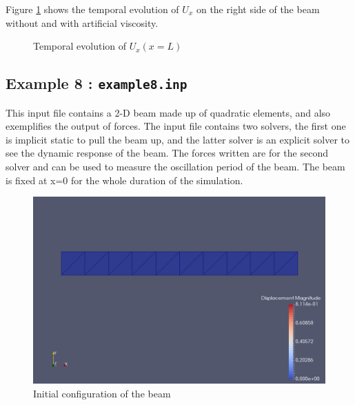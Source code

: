 \documentclass[oneside,11pt,times]{book}
\begin{document}
Figure \ref{fig:ex7} shows the temporal evolution of $U_x$ on the right side of the beam without and with artificial viscosity.

\begin{figure}[h!]
    \centering
	\caption{Temporal evolution of $U_x(x=L)$}
    \label{fig:ex7}
\end{figure}

\newpage

\subsection{Example 8 : \texttt{example8.inp}}
This input file contains a 2-D beam made up of quadratic elements, and also exemplifies the output of forces. The input file contains two solvers, the first one is implicit static to pull the beam up, and the latter solver is an explicit solver to see the dynamic response of the beam. The forces written are for the second solver and can be used to measure the oscillation period of the beam. The beam is fixed at x=0 for the whole duration of the simulation.

\begin{figure}[h!]
    \centering
    \includegraphics[scale=0.28]{imgs/Examples/ex8-BC.png}
    \caption{Initial configuration of the beam}
    \label{ex8-BC}
\end{figure}
\end{document}
